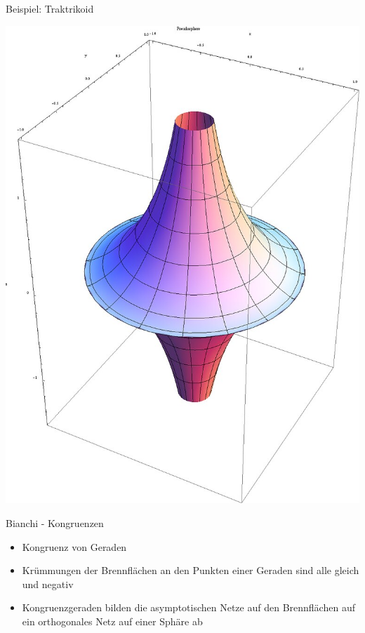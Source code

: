 \documentclass[12pt]{beamer}
\begin{document}
\begin{frame}{Beispiel: Traktrikoid}

\begin{center}
\includegraphics[scale=0.2]{pseudosphere.png}
\end{center}

\end{frame}

\begin{frame}{Bianchi - Kongruenzen}

\begin{itemize}
\item Kongruenz von Geraden
\item Krümmungen der Brennflächen an den Punkten einer Geraden sind alle gleich und negativ
\item Kongruenzgeraden bilden die asymptotischen Netze auf den Brennflächen auf ein orthogonales Netz auf einer Sphäre ab \cite{b_congruence_enc}
\end{itemize}

\end{frame}
\end{document}
